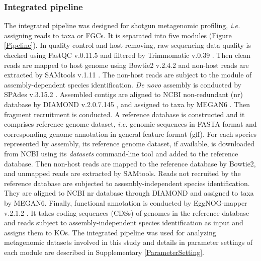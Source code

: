 \documentclass[11pt]{article}
\begin{document}
      \subsubsection{Integrated pipeline}
      The integrated pipeline was designed for shotgun metagenomic profiling, \textit{i.e.} assigning reads to taxa or FGCs. 
      It is separated into five modules (Figure \ref{Pipeline}).
      \newline
      In quality control and host removing, raw sequencing data quality is checked using FastQC v.0.11.5 \citep{andrews2010fastqc} and filtered by Trimmomatic v.0.39 \citep{bolger2014trimmomatic}. 
      Then clean reads are mapped to host genome using Bowtie2 v.2.4.2 \citep{langmead2012fast} and non-host reads are extracted by SAMtools v.1.11 \citep{li2009sequence}. 
      \newline
      The non-host reads are subject to the module of assembly-dependent species identification. 
      \textit{De novo} assembly is conducted by SPAdes v.3.15.2 \citep{prjibelski2020using}. 
      Assembled contigs are aligned to NCBI non-redundant (nr) database by DIAMOND v.2.0.7.145 \citep{buchfink2015fast}, and assigned to taxa by MEGAN6 \citep{huson2007megan}. 
      \newline
      Then fragment recruitment is conducted. 
      A reference database is constructed and it comprises reference genome dataset, \textit{i.e.} genomic sequences in FASTA format and corresponding genome annotation in general feature format (gff). 
      For each species represented by assembly, its reference genome dataset, if available, is downloaded from NCBI using its \textit{datasets} command-line tool and added to the reference database. 
      Then non-host reads are mapped to the reference database by Bowtie2, and unmapped reads are extracted by SAMtools. 
      \newline
      Reads not recruited by the reference database are subjected to assembly-independent species identification. 
      They are aligned to NCBI nr database through DIAMOND and assigned to taxa by MEGAN6.
      \newline
      Finally, functional annotation is conducted by EggNOG-mapper v.2.1.2 \citep{huerta2017fast}. 
      It takes coding sequences (CDSs) of genomes in the reference database and reads subject to assembly-independent species identification as input and assigns them to KOs.
      \newline
      The integrated pipeline was used for analyzing metagenomic datasets involved in this study and details in parameter settings of each module are described in Supplementary \ref{ParameterSetting}.
      
\end{document}
